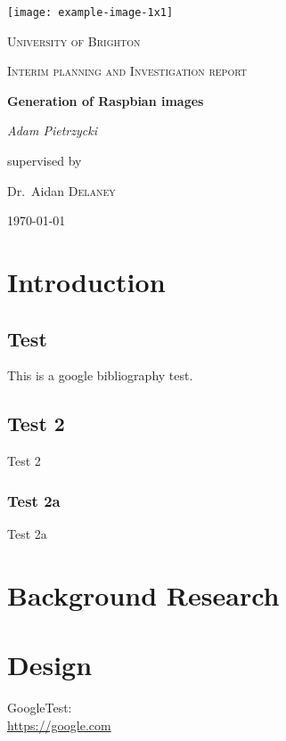 \documentclass[12pt,a4paper]{report}
\begin{document}
\begin{titlepage}
	\centering
	\texttt{[image: example-image-1x1]}\par\vspace{1cm}
	{\scshape\LARGE University of Brighton\par}
	\vspace{1cm}
	{\scshape\Large Interim planning and Investigation report\par}
	\vspace{1.5cm}
	{\huge\bfseries Generation of Raspbian images\par}
	\vspace{2cm}
	{\Large\itshape Adam Pietrzycki\par}
	\vfill
	supervised by\par
	Dr.~Aidan \textsc{Delaney}
	\vfill

	{\large \today\par}
\end{titlepage}

\begin{abstract}

\end{abstract}

\pagebreak
\tableofcontents
\pagebreak

\chapter{Introduction}
\section{Test}
This is a google \cite{google} bibliography test.
\section{Test 2}
Test 2
\subsection{Test 2a}
Test 2a

\chapter{Background Research}

\chapter{Design}

\begin{thebibliography}{9}
GoogleTest:
\\\url{https://google.com}
\end{thebibliography}
\end{document}
